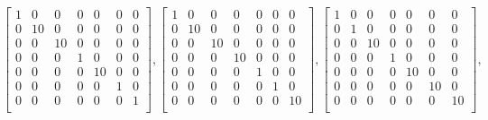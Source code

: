 $$
\left[
\begin{array}{*{7}{r}}
1 & 0 & 0 & 0 & 0 & 0 & 0\\
0 & 10 & 0 & 0 & 0 & 0 & 0\\
0 & 0 & 10 & 0 & 0 & 0 & 0\\
0 & 0 & 0 & 1 & 0 & 0 & 0\\
0 & 0 & 0 & 0 & 10 & 0 & 0\\
0 & 0 & 0 & 0 & 0 & 1 & 0\\
0 & 0 & 0 & 0 & 0 & 0 & 1\\
\end{array}
\right]
, 
\left[
\begin{array}{*{7}{r}}
1 & 0 & 0 & 0 & 0 & 0 & 0\\
0 & 10 & 0 & 0 & 0 & 0 & 0\\
0 & 0 & 10 & 0 & 0 & 0 & 0\\
0 & 0 & 0 & 10 & 0 & 0 & 0\\
0 & 0 & 0 & 0 & 1 & 0 & 0\\
0 & 0 & 0 & 0 & 0 & 1 & 0\\
0 & 0 & 0 & 0 & 0 & 0 & 10\\
\end{array}
\right]
, 
\left[
\begin{array}{*{7}{r}}
1 & 0 & 0 & 0 & 0 & 0 & 0\\
0 & 1 & 0 & 0 & 0 & 0 & 0\\
0 & 0 & 10 & 0 & 0 & 0 & 0\\
0 & 0 & 0 & 1 & 0 & 0 & 0\\
0 & 0 & 0 & 0 & 10 & 0 & 0\\
0 & 0 & 0 & 0 & 0 & 10 & 0\\
0 & 0 & 0 & 0 & 0 & 0 & 10\\
\end{array}
\right]
, 
$$
